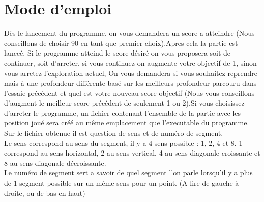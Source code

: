\documentclass[11pt]{article}
\begin{document}
\section{Mode d'emploi}
		Dès le lancement du programme, on vous demandera un score a atteindre (Nous conseillons de choisir 90 en tant que premier choix).\newline Apres cela la partie est lanceé. Si le programme atteind le score désiré on vous proposera soit de continuer, soit d'arreter, si vous continuez on augmente votre objectif de 1, sinon vous arretez l'exploration actuel, On vous demandera si vous souhaitez reprendre mais à une profondeur différente basé sur les meilleurs profondeur parcouru dans l'essaie précédent et quel est votre nouveau score objectif (Nous vous conseillons d'augment le meilleur score précédent de seulement 1 ou 2).\newline Si vous choisissez d'arreter le programme, un fichier contenant l'ensemble de la partie avec les position joué sera créé au même emplacement que l'executable du programme.\\Sur le fichier obtenue il est question de sens et de numéro de segment.\\Le sens correspond au sens du segment, il y a 4 sens possible : 1, 2, 4 et 8. 1 correspond au sens horizontal, 2 au sens vertical, 4 au sens diagonale croissante et 8 au sens diagonale décroissante.\\Le numéro de segment sert a savoir de quel segment l'on parle lorsqu'il y a plus de 1 segment possible sur un même sens pour un point. (A lire de gauche à droite, ou de bas en haut)
		
\end{document}
